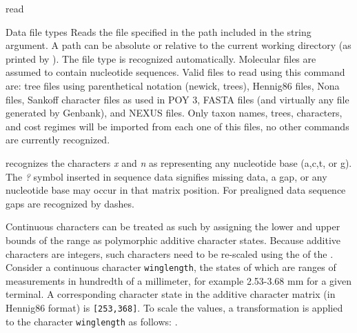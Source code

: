\begin{command}{read}{}
\begin{arguments}
\begin{argumentgroup}{Data file types}
                {Reads the file specified in the path included in the string argument.
                A path can be absolute or relative to the current working
                directory (as printed by ). The file type is
                recognized automatically.  Molecular files are assumed to
                contain nucleotide sequences. Valid files to read using this
                command are: tree files using parenthetical notation (newick,
                \poy trees), Hennig86 files, Nona files, Sankoff character files
                as used in POY 3, FASTA files (and virtually any file generated
                by Genbank), and NEXUS files. Only taxon names, trees,
                characters, and cost regimes will be imported from each one of
                this files, no other commands are currently recognized.} {}
                
            \begin{statement}
                \poy recognizes the characters \emph{x} and \emph{n} as
                representing any nucleotide base (a,c,t, or g).  The \emph{?}
                symbol inserted in sequence data signifies missing data, a gap,
                or any nucleotide base may occur in that matrix position.
                For prealigned data sequence gaps are recognized by dashes.
            \end{statement}

	
	        \begin{statement}
                Continuous characters can be treated as such by assigning the lower
                and upper bounds of the range as polymorphic additive character 
                states. Because additive characters are integers, such characters 
                need to be re-scaled using the  of the 
                . Consider a continuous
                character \texttt{winglength}, the states of which are ranges of 
                measurements in hundredth of a millimeter, for example 2.53-3.68 
                mm for a given terminal. A corresponding character state in the 
                additive character matrix (in Hennig86 format) is \texttt{[253,368]}. 
                To scale the values, a transformation is applied to the character 
                \texttt{winglength} as follows:
                .
	        \end{statement}
	

\end{argumentgroup}
\end{arguments}
\end{command}
